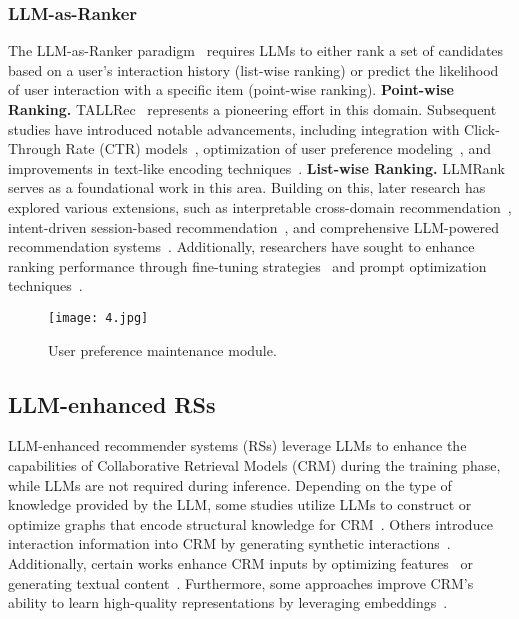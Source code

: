 \subsubsection{LLM-as-Ranker}
The LLM-as-Ranker paradigm~\cite{cao2024aligning,luo2024recranker} requires LLMs to either rank a set of candidates based on a user's interaction history (list-wise ranking) or predict the likelihood of user interaction with a specific item (point-wise ranking).
\textbf{Point-wise Ranking.} TALLRec~\cite{bao2023tallrec} represents a pioneering effort in this domain. Subsequent studies have introduced notable advancements, including integration with Click-Through Rate (CTR) models~\cite{lin2024clickprompt,lin2024rella}, optimization of user preference modeling~\cite{zheng2024harnessing}, and improvements in text-like encoding techniques~\cite{zhang2024text}.
\textbf{List-wise Ranking.} LLMRank~\cite{hou2024large} serves as a foundational work in this area. Building on this, later research has explored various extensions, such as interpretable cross-domain recommendation~\cite{petruzzelli2024instructing}, intent-driven session-based recommendation~\cite{sun2024large}, and comprehensive LLM-powered recommendation systems~\cite{kim2024large}. Additionally, researchers have sought to enhance ranking performance through fine-tuning strategies~\cite{yue2023llamarec,liao2024llara,chen2024softmax,liu2022parameter} and prompt optimization techniques~\cite{wang2024whole}.

\begin{figure}[t]
  \centering
  \texttt{[image: 4.jpg]}
  \caption{User preference maintenance module.}
  \label{fig:8mke}
\end{figure}

\subsection{LLM-enhanced RSs}
LLM-enhanced recommender systems (RSs) leverage LLMs to enhance the capabilities of Collaborative Retrieval Models (CRM) during the training phase, while LLMs are not required during inference. Depending on the type of knowledge provided by the LLM, some studies utilize LLMs to construct or optimize graphs that encode structural knowledge for CRM~\cite{hu2024bridging, zhang2024finerec, sakurai2024llm, wang2024llmrg, yang2024sequential,liu2024filtering}. Others introduce interaction information into CRM by generating synthetic interactions~\cite{wang2024large, wei2024llmrec}. Additionally, certain works enhance CRM inputs by optimizing features~\cite{jia2024altfs, wang2024llms,liu2023triple} or generating textual content~\cite{zhang2024embsum, du2024enhancing, sun2024largecf, xi2024towards}. Furthermore, some approaches improve CRM’s ability to learn high-quality representations by leveraging embeddings~\cite{geng2024breaking, wang2024can, cui2024distillation, liu2024large, harte2023leveraging, zhang2024notellm, ren2024representation}.